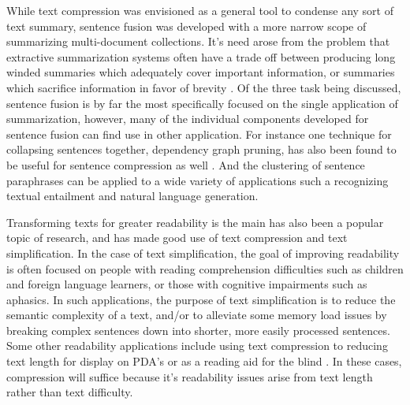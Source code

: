 {{While text compression was envisioned as a general tool to condense any sort of text summary, sentence fusion was developed with a more narrow scope of summarizing multi-document collections.  It's need  arose from the problem that extractive summarization systems often have a trade off between producing long winded summaries which adequately cover important information, or summaries which sacrifice information in favor of brevity \citep{Filippova:2008:SFV:1613715.1613741}.  Of the three task being discussed, sentence fusion is by far the most specifically focused on the single application of summarization,  however, many of the individual components developed for sentence fusion can find use in other application.  For instance one technique for collapsing sentences together, dependency graph pruning, has also been found to be useful for sentence compression as well \citep{filippova2008dependency}.  And the clustering of sentence paraphrases can be applied to a wide variety of applications such a recognizing textual entailment \citep{dagan2006pascal} and natural language generation\citep{zhao2010leveraging}.}


{Transforming texts for greater readability is the main  has also been a popular topic of research, and has made good use of text compression and text simplification.  In the case of text simplification, the goal of improving readability is often focused on people with reading comprehension difficulties such as children and foreign language learners, or those with cognitive impairments such as aphasics\citep{Feng2008}. In such applications, the purpose of text simplification is to reduce the semantic complexity of a text, and/or to alleviate some memory load issues by breaking complex sentences down into shorter, more easily processed sentences.  Some other readability applications include using text compression to reducing text length for display on PDA's \citep{Corston-Oliver 2001} or as a reading aid for the blind \citep{Grefenstette 1998}.  In these cases, compression will suffice because it's readability issues arise from text length rather than text difficulty.}
 
 
\iffalse
{Text simplification has also generated interest in the field of information extraction as a means to improve recall for some specialized document collections.  For instance, in the bio-medical field, processing documents using the standard NLP approaches of POS taggers, parse trees, and dependency trees results in poor performance due to the syntactic complexity of academic writing.  By breaking up these long syntactically complex sentences into smaller sentences using text simplification, recall is improved \citep{jonnalagadda2010biosimplify}.}
\fi


}
